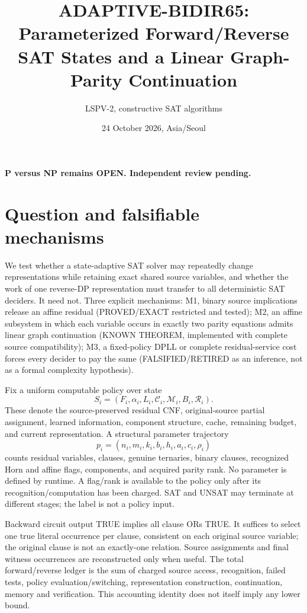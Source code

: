 \documentclass[11pt]{article}
\title{ADAPTIVE-BIDIR65: Parameterized Forward/Reverse SAT States and a Linear Graph-Parity Continuation}
\author{LSPV-2, constructive SAT algorithms}
\date{24 October 2026, Asia/Seoul}
\begin{document}
\maketitle
\begin{center}\textbf{P versus NP remains OPEN. Independent review pending.}\end{center}
\section{Question and falsifiable mechanisms}
We test whether a state-adaptive SAT solver may repeatedly change representations while retaining exact shared source variables, and whether the work of one reverse-DP representation must transfer to all deterministic SAT deciders. It need not. Three explicit mechanisms: M1, binary source implications release an affine residual (PROVED/EXACT restricted and tested); M2, an affine subsystem in which each variable occurs in exactly two parity equations admits linear graph continuation (KNOWN THEOREM, implemented with complete source compatibility); M3, a fixed-policy DPLL or complete residual-service cost forces every decider to pay the same (FALSIFIED/RETIRED as an inference, not as a formal complexity hypothesis).

Fix a uniform computable policy over state
\[
S_i=(F_i,\alpha_i,L_i,\mathcal C_i,\mathcal M_i,B_i,\mathcal R_i).
\]
These denote the source-preserved residual CNF, original-source partial assignment, learned information, component structure, cache, remaining budget, and current representation. A structural parameter trajectory
\[
p_i=(n_i,m_i,k_i,b_i,h_i,a_i,c_i,\rho_i)
\]
counts residual variables, clauses, genuine ternaries, binary clauses, recognized Horn and affine flags, components, and acquired parity rank. No parameter is defined by runtime. A flag/rank is available to the policy only after its recognition/computation has been charged. SAT and UNSAT may terminate at different stages; the label is not a policy input.

Backward circuit output TRUE implies all clause ORs TRUE. It suffices to select one true literal occurrence per clause, consistent on each original source variable; the original clause is not an exactly-one relation. Source assignments and final witness occurrences are reconstructed only when useful. The total forward/reverse ledger is the sum of charged source access, recognition, failed tests, policy evaluation/switching, representation construction, continuation, memory and verification. This accounting identity does not itself imply any lower bound.
\end{document}
